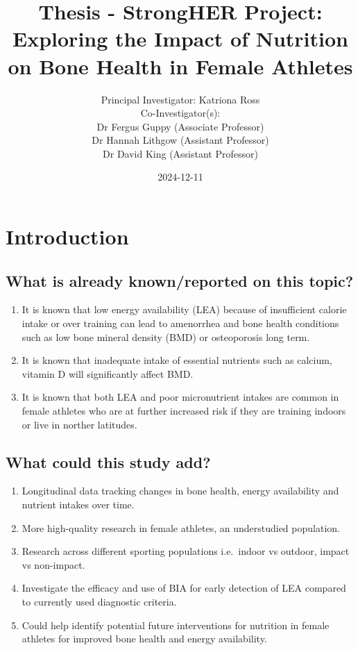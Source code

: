 \documentclass[
]{article}
\title{Thesis - StrongHER Project: Exploring the Impact of Nutrition on Bone Health in Female Athletes}
\author{Principal Investigator: Katriona Ross\\
Co-Investigator(s):\\
Dr Fergus Guppy (Associate Professor)\\
Dr Hannah Lithgow (Assistant Professor)\\
Dr David King (Assistant Professor)}
\date{2024-12-11}
\begin{document}
\maketitle

{
\setcounter{tocdepth}{2}
\tableofcontents
}
\section{Introduction}\label{introduction}

\subsection{What is already known/reported on this topic?}\label{what-is-already-knownreported-on-this-topic}

\begin{enumerate}
\def\labelenumi{\arabic{enumi}.}
\item
  It is known that low energy availability (LEA) because of insufficient calorie intake or over training can lead to amenorrhea and bone health conditions such as low bone mineral density (BMD) or osteoporosis long term.
\item
  It is known that inadequate intake of essential nutrients such as calcium, vitamin D will significantly affect BMD.
\item
  It is known that both LEA and poor micronutrient intakes are common in female athletes who are at further increased risk if they are training indoors or live in norther latitudes.
\end{enumerate}

\subsection{What could this study add?}\label{what-could-this-study-add}

\begin{enumerate}
\def\labelenumi{\arabic{enumi}.}
\item
  Longitudinal data tracking changes in bone health, energy availability and nutrient intakes over time.
\item
  More high-quality research in female athletes, an understudied population.
\item
  Research across different sporting populations i.e.~indoor vs outdoor, impact vs non-impact.
\item
  Investigate the efficacy and use of BIA for early detection of LEA compared to currently used diagnostic criteria.
\item
  Could help identify potential future interventions for nutrition in female athletes for improved bone health and energy availability.
\end{enumerate}
\end{document}
